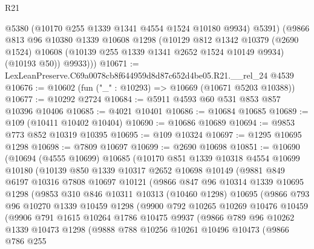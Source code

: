 \begin{lexlean}{R21}
\begin{coremodule}
          @5380
          (@10170 @255 @1339 @1341 @4554 @1524 @10180 @9934)
          @5391)
        (@9866
          @813
          @96
          @10380
          @1339
          @10608
          @1298
          (@10129
            @812
            @1342
            @10379
            (@2690 @1524)
            @10608
            (@10139 @255 @1339 @1341 @2652 @1524 @10149 @9934)
            (@10193 @50))
          @9933)))
@10671 := LexLeanPreserve.C69a0078cb8f644959d8d87c652d4be05.R21.__rel_24 @4539
@10676 := @10602 (fun ("_" : @10293) => @10669 (@10671 @5203 @10388))
@10677 := @10292 @2724
@10684 := @5911 @4593 @60 @531 @853 @857 @10396 @10406
@10685 := @4021 @10401
@10686 := @10684 @10685
@10689 := @109 (@10411 @10402 @10404)
@10690 := @10686 @10689
@10694 := @9853 @773 @852 @10319 @10395
@10695 := @109 @10324
@10697 := @1295 @10695 @1298
@10698 := @7809 @10697
@10699 := @2690 @10698
@10851 := @10690
    (@10694
      (@4555 @10699)
      @10685
      (@10170
        @851
        @1339
        @10318
        @4554
        @10699
        @10180
        (@10139
          @850
          @1339
          @10317
          @2652
          @10698
          @10149
          (@9881
            @849
            @6197
            @10316
            @7808
            @10697
            @10121
            (@9866
              @847
              @96
              @10314
              @1339
              @10695
              @1298
              (@9853
                @310
                @846
                @10311
                @10313
                (@10460 @1298)
                @10695
                (@9866
                  @793
                  @96
                  @10270
                  @1339
                  @10459
                  @1298
                  (@9900
                    @792
                    @10265
                    @10269
                    @10476
                    @10459
                    (@9906
                      @791
                      @1615
                      @10264
                      @1786
                      @10475
                      @9937
                      (@9866
                        @789
                        @96
                        @10262
                        @1339
                        @10473
                        @1298
                        (@9888
                          @788
                          @10256
                          @10261
                          @10496
                          @10473
                          (@9866
                            @786
                            @255

\end{coremodule}
\end{lexlean}
